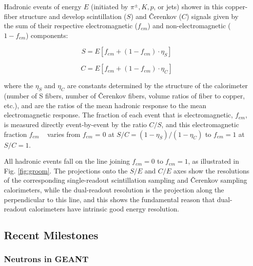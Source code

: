 Hadronic events of energy $E$ (initiated by $\pi^{\pm}, K, p$, or jets) shower in this copper-fiber structure and develop scintillation ($S$) and 
\v{C}er\-enk\-ov ($C$) signals given by the sum of their respective electromagnetic ($f_{em}$) and non-electromagnetic ($1-f_{em}$) components:

\begin{displaymath}
  S = E [ f_{em} + (1 - f_{em}) \cdot \eta_S ]
\end{displaymath}

\begin{displaymath}
  C = E [ f_{em} + (1 - f_{em}) \cdot \eta_C ]
\end{displaymath}

\noindent where the $\eta_S$ and $\eta_C$ are constants determined by the structure of the calorimeter (number of S fibers, number of \v{C}er\-enk\-ov fibers, volume ratios of fiber to copper, etc.), and are the ratios of the mean hadronic response to the mean electromagnetic response.  The fraction of each event that is electromagnetic, $f_{em}$, is measured directly event-by-event by the ratio $C/S$, and this electromagnetic fraction $f_{em}$ ~ varies from $f_{em}$ = 0 at $S/C = (1-\eta_S)/(1-\eta_C)$ to $f_{em}=1$ at $S/C=1$.

All hadronic events fall on the line joining $f_{em}=0$ to $f_{em}=1$, as illustrated in Fig. \ref{fig:groom}.  The projections 
onto the $S/E$ and $C/E$   axes show the resolutions of the corresponding single-readout scintillation sampling and \v{C}er\-enk\-ov sampling calorimeters, while the dual-readout resolution is the projection along the perpendicular to this line, and
  this shows the fundamental reason that dual-readout calorimeters have intrinsic good energy resolution.

\subsection{Recent Milestones}

\subsubsection{Neutrons in GEANT} 
\label{sec:geant}  


